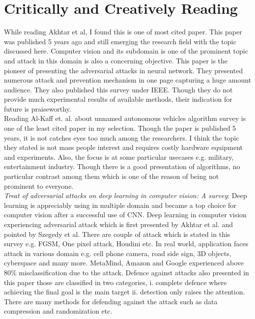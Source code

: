 \section{Critically and Creatively Reading}
While reading Akhtar et al\cite{akhtar_threat_2018}, I found this is one of most cited paper. This paper was published 5 years ago and still emerging the research field with the topic discussed here. Computer vision and its subdomain is one of the prominent topic and attack in this domain is also a concerning objective. This paper is the pioneer of presenting the adversarial attacks in neural network. They presented numerous attack and prevention mechanism in one page capturing a huge amount audience. They also published this survey under IEEE. Though they do not provide much experimental results of available methods, their indication for future is praiseworthy.\\

Reading Al-Kaff et. al. \cite{al-kaff_survey_2018} about unnamed autonomous vehicles algorithm survey is one of the least cited paper in my selection. Though the paper is published 5 years, it is not catches eyes too much among the researchers. I think the topic they stated is not mass people interest and requires costly hardware equipment and experiments. Also, the focus is at some particular usecases e.g. military, entertainment industry. Though there is a good presentation of algorithms, no particular contrast among them which is one of the reason of being not prominent to everyone.\\ 

\textit{Treat of adversarial attacks on deep learning in computer vision: A survey}\cite{akhtar_threat_2018}: Deep learning is appreciably using in multiple domain and became a top choice for computer vision after a successful use of CNN. Deep learning in computer vision experiencing adversarial attack which is first presented by Akhtar et al. and pointed by Szegedy et al. There are couple of attack which is stated in this survey e.g. FGSM, One pixel attack, Houdini etc. In real world, application faces attack in various domain e.g. cell phone camera, road side sign, 3D objects, cyberspace and many more. MetaMind, Amazon and Google experienced above 80\% misclassification due to the attack. Defence against attacks also presented in this paper those are classified in two categories, i. complete defence where achieving the final goal is the main target ii. detection only raises the attention. There are many methods for defending against the attack such as data compression and randomization etc.\\


